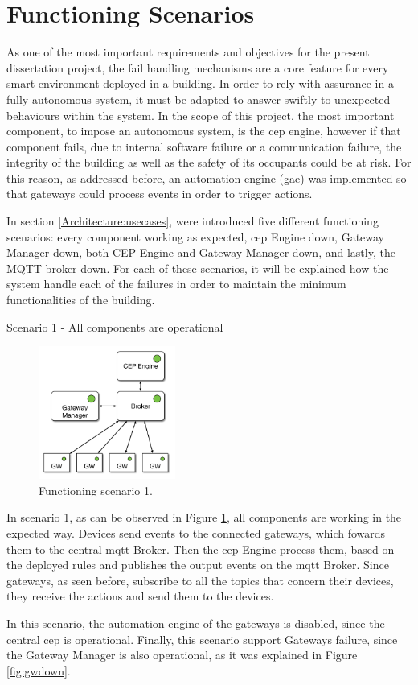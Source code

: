 \section{Functioning Scenarios}
\label{implementation:scenarios}

As one of the most important requirements and objectives for the present dissertation project, the fail handling mechanisms are a core feature for every smart environment deployed in a building. In order to rely with assurance in a fully autonomous system, it must be adapted to answer swiftly to unexpected behaviours within the system. In the scope of this project, the most important component, to impose an autonomous system, is the \ac{cep} engine, however if that component fails, due to internal software failure or a communication failure, the integrity of the building as well as the safety of its occupants could be at risk. For this reason, as addressed before, an automation engine (\ac{gae}) was implemented so that gateways could process events in order to trigger actions.

In section \ref{Architecture:usecases}, were introduced five different functioning scenarios: every component working as expected, \ac{cep} Engine down, Gateway Manager down, both CEP Engine and Gateway Manager down, and lastly, the MQTT broker down. For each of these scenarios, it will be explained how the system handle each of the failures in order to maintain the minimum functionalities of the building. 
\begin{Paragraph}{Scenario 1 - All components are operational}
\begin{figure}[H]
	\centering
	\includegraphics[width=0.4\textwidth]{figures/fs1.png}
	\caption{Functioning scenario 1.}
	\label{fig:fs1}
\end{figure}

In scenario 1, as can be observed in Figure \ref{fig:fs1}, all components are working in the expected way. Devices send events to the connected gateways, which fowards them to the central \ac{mqtt} Broker. Then the \ac{cep} Engine process them, based on the deployed rules and publishes the output events on the \ac{mqtt} Broker. Since gateways, as seen before, subscribe to all the topics that concern their devices, they receive the actions and send them to the devices.

In this scenario, the automation engine of the gateways is disabled, since the central \ac{cep} is operational. Finally, this scenario support Gateways failure, since the Gateway Manager is also operational, as it was explained in Figure \ref{fig:gwdown}.

\end{Paragraph}

